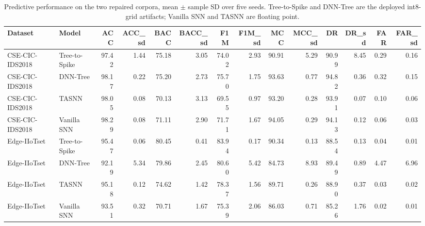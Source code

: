 \begin{table}[t]\centering\small
\caption{Predictive performance on the two repaired corpora, mean $\pm$ sample SD over five seeds. Tree-to-Spike and DNN-Tree are the deployed int8-grid artifacts; Vanilla SNN and TASNN are floating point.}
\label{tab:repaired:predictive}
\begin{tabular}{llrrrrrrrrrrrr}
\toprule
Dataset & Model & ACC & ACC_sd & BACC & BACC_sd & F1M & F1M_sd & MCC & MCC_sd & DR & DR_sd & FAR & FAR_sd \\
\midrule
CSE-CIC-IDS2018 & Tree-to-Spike & 97.42 & 1.44 & 75.18 & 3.05 & 74.02 & 2.93 & 90.91 & 5.29 & 90.99 & 8.45 & 0.29 & 0.16 \\
CSE-CIC-IDS2018 & DNN-Tree & 98.17 & 0.22 & 75.20 & 2.73 & 75.70 & 1.75 & 93.63 & 0.77 & 94.82 & 0.36 & 0.32 & 0.15 \\
CSE-CIC-IDS2018 & TASNN & 98.05 & 0.08 & 70.13 & 3.13 & 69.55 & 0.97 & 93.20 & 0.28 & 93.91 & 0.07 & 0.10 & 0.06 \\
CSE-CIC-IDS2018 & Vanilla SNN & 98.29 & 0.08 & 71.11 & 2.90 & 71.71 & 1.67 & 94.05 & 0.29 & 94.13 & 0.12 & 0.06 & 0.03 \\
Edge-IIoTset & Tree-to-Spike & 95.47 & 0.06 & 80.45 & 0.41 & 83.94 & 0.17 & 90.34 & 0.13 & 88.54 & 0.13 & 0.04 & 0.01 \\
Edge-IIoTset & DNN-Tree & 92.19 & 5.34 & 79.86 & 2.45 & 80.60 & 5.42 & 84.73 & 8.93 & 89.49 & 0.89 & 4.47 & 6.96 \\
Edge-IIoTset & TASNN & 95.18 & 0.12 & 74.62 & 1.42 & 78.37 & 1.56 & 89.71 & 0.26 & 88.90 & 0.37 & 0.03 & 0.02 \\
Edge-IIoTset & Vanilla SNN & 93.51 & 0.32 & 70.71 & 1.67 & 75.39 & 2.06 & 86.03 & 0.71 & 85.26 & 1.76 & 0.02 & 0.01 \\
\bottomrule
\end{tabular}
\end{table}
